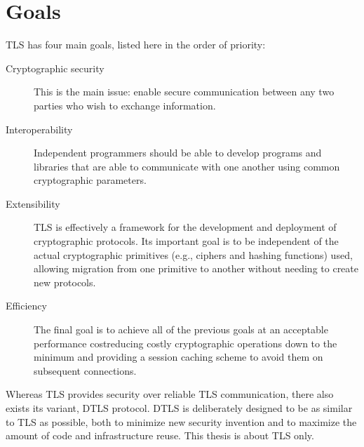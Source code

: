 \section{Goals}

TLS has four main goals, listed here in the order of priority:

\begin{description}
  \item[Cryptographic security] This is the main issue: enable secure communication between any two parties who wish to exchange information.
  \item[Interoperability] Independent programmers should be able to develop programs and libraries that are able to communicate with one another using common cryptographic parameters.
  \item[Extensibility] TLS is effectively a framework for the development and deployment of cryptographic protocols. Its important goal is to be independent of the actual cryptographic primitives (e.g., ciphers and hashing functions) used, allowing migration from one primitive to another without needing to create new protocols.
  \item[Efficiency] The final goal is to achieve all of the previous goals at an acceptable performance costreducing costly cryptographic operations down to the minimum and providing a session caching scheme to avoid them on subsequent connections. \cite{ristic2014bulletproof}
\end{description}

Whereas TLS provides security over reliable TLS communication, there also exists its variant, DTLS protocol. DTLS is deliberately designed to be as similar to TLS as possible, both to minimize new security invention and to maximize the amount of code and infrastructure reuse.\cite{rfc6347} This thesis is about TLS only.

